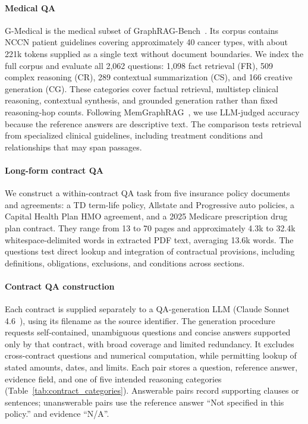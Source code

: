 \documentclass[sigconf, review, anonymous]{acmart}
\begin{document}
\paragraph{Medical QA}
G-Medical is the medical subset of GraphRAG-Bench~\cite{xiang2025when}. Its corpus contains NCCN patient guidelines covering approximately 40 cancer types, with about 221k tokens supplied as a single text without document boundaries. We index the full corpus and evaluate all 2,062 questions: 1,098 fact retrieval (FR), 509 complex reasoning (CR), 289 contextual summarization (CS), and 166 creative generation (CG). These categories cover factual retrieval, multistep clinical reasoning, contextual synthesis, and grounded generation rather than fixed reasoning-hop counts. Following MemGraphRAG~\cite{wu2026memgraphrag}, we use LLM-judged accuracy because the reference answers are descriptive text. The comparison tests retrieval from specialized clinical guidelines, including treatment conditions and relationships that may span passages.

\paragraph{Long-form contract QA}
We construct a within-contract QA task from five insurance policy documents and agreements: a TD term-life policy, Allstate and Progressive auto policies, a Capital Health Plan HMO agreement, and a 2025 Medicare prescription drug plan contract. They range from 13 to 70 pages and approximately 4.3k to 32.4k whitespace-delimited words in extracted PDF text, averaging 13.6k words. The questions test direct lookup and integration of contractual provisions, including definitions, obligations, exclusions, and conditions across sections.

\paragraph{Contract QA construction}
\label{sec:contractqa}
Each contract is supplied separately to a QA-generation LLM (Claude Sonnet 4.6~\cite{anthropic2026claude46}), using its filename as the source identifier. The generation procedure requests self-contained, unambiguous questions and concise answers supported only by that contract, with broad coverage and limited redundancy. It excludes cross-contract questions and numerical computation, while permitting lookup of stated amounts, dates, and limits. Each pair stores a question, reference answer, evidence field, and one of five intended reasoning categories (Table~\ref{tab:contract_categories}). Answerable pairs record supporting clauses or sentences; unanswerable pairs use the reference answer ``Not specified in this policy.'' and evidence ``N/A''.
\end{document}
